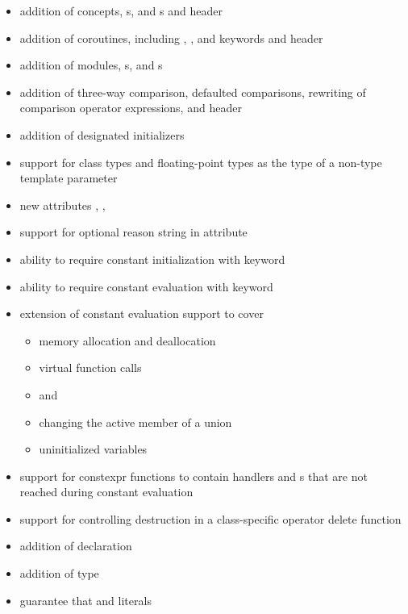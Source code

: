 \begin{itemize}
\item addition of concepts, s, and s and
 header
\item addition of coroutines, including
, , and  keywords and
 header
\item addition of modules, s, and s
\item addition of three-way comparison, defaulted comparisons,
rewriting of comparison operator expressions, and  header
\item addition of designated initializers
\item support for class types and floating-point types as the type of a non-type template parameter
\item new attributes , \tcode{[[likely]]}, \tcode{[[unlikely]]}
\item support for optional reason string in \tcode{[[nodiscard]]} attribute
\item ability to require constant initialization with  keyword
\item ability to require constant evaluation with  keyword
\item extension of constant evaluation support to cover
\begin{itemize}
  \item memory allocation and deallocation
  \item virtual function calls
  \item {} and 
  \item changing the active member of a union
  \item uninitialized variables
\end{itemize}
\item support for constexpr functions to contain
 handlers and s
that are not reached during constant evaluation
\item support for controlling destruction in a class-specific operator delete function
\item addition of   declaration
\item addition of  type
\item guarantee that  and  literals

\end{itemize}
